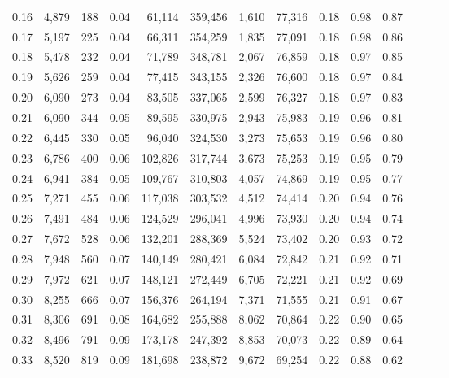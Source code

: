 \begin{tabular}{rrrrrrrrrrrrrr}
0.16 &   4,879 &    188 &  0.04 &   61,114 &  359,456 &   1,610 &  77,316 &  0.18 &  0.98 &      0.87 \\
0.17 &   5,197 &    225 &  0.04 &   66,311 &  354,259 &   1,835 &  77,091 &  0.18 &  0.98 &      0.86 \\
0.18 &   5,478 &    232 &  0.04 &   71,789 &  348,781 &   2,067 &  76,859 &  0.18 &  0.97 &      0.85 \\
0.19 &   5,626 &    259 &  0.04 &   77,415 &  343,155 &   2,326 &  76,600 &  0.18 &  0.97 &      0.84 \\
0.20 &   6,090 &    273 &  0.04 &   83,505 &  337,065 &   2,599 &  76,327 &  0.18 &  0.97 &      0.83 \\
0.21 &   6,090 &    344 &  0.05 &   89,595 &  330,975 &   2,943 &  75,983 &  0.19 &  0.96 &      0.81 \\
0.22 &   6,445 &    330 &  0.05 &   96,040 &  324,530 &   3,273 &  75,653 &  0.19 &  0.96 &      0.80 \\
0.23 &   6,786 &    400 &  0.06 &  102,826 &  317,744 &   3,673 &  75,253 &  0.19 &  0.95 &      0.79 \\
0.24 &   6,941 &    384 &  0.05 &  109,767 &  310,803 &   4,057 &  74,869 &  0.19 &  0.95 &      0.77 \\
0.25 &   7,271 &    455 &  0.06 &  117,038 &  303,532 &   4,512 &  74,414 &  0.20 &  0.94 &      0.76 \\
0.26 &   7,491 &    484 &  0.06 &  124,529 &  296,041 &   4,996 &  73,930 &  0.20 &  0.94 &      0.74 \\
0.27 &   7,672 &    528 &  0.06 &  132,201 &  288,369 &   5,524 &  73,402 &  0.20 &  0.93 &      0.72 \\
0.28 &   7,948 &    560 &  0.07 &  140,149 &  280,421 &   6,084 &  72,842 &  0.21 &  0.92 &      0.71 \\
0.29 &   7,972 &    621 &  0.07 &  148,121 &  272,449 &   6,705 &  72,221 &  0.21 &  0.92 &      0.69 \\
0.30 &   8,255 &    666 &  0.07 &  156,376 &  264,194 &   7,371 &  71,555 &  0.21 &  0.91 &      0.67 \\
0.31 &   8,306 &    691 &  0.08 &  164,682 &  255,888 &   8,062 &  70,864 &  0.22 &  0.90 &      0.65 \\
0.32 &   8,496 &    791 &  0.09 &  173,178 &  247,392 &   8,853 &  70,073 &  0.22 &  0.89 &      0.64 \\
0.33 &   8,520 &    819 &  0.09 &  181,698 &  238,872 &   9,672 &  69,254 &  0.22 &  0.88 &      0.62 \\

\end{tabular}
